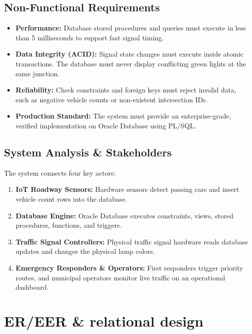 \documentclass[11pt,a4paper]{article}
\begin{document}
\subsection{Non-Functional Requirements}
\begin{itemize}
    \item \textbf{Performance:} Database stored procedures and queries must execute in less than 5 milliseconds to support fast signal timing.
    \item \textbf{Data Integrity (ACID):} Signal state changes must execute inside atomic transactions. The database must never display conflicting green lights at the same junction.
    \item \textbf{Reliability:} Check constraints and foreign keys must reject invalid data, such as negative vehicle counts or non-existent intersection IDs.
    \item \textbf{Production Standard:} The system must provide an enterprise-grade, verified implementation on Oracle Database using PL/SQL.
\end{itemize}

\subsection{System Analysis \& Stakeholders}
The system connects four key actors:
\begin{enumerate}
    \item \textbf{IoT Roadway Sensors:} Hardware sensors detect passing cars and insert vehicle count rows into the database.
    \item \textbf{Database Engine:} Oracle Database executes constraints, views, stored procedures, functions, and triggers.
    \item \textbf{Traffic Signal Controllers:} Physical traffic signal hardware reads database updates and changes the physical lamp colors.
    \item \textbf{Emergency Responders \& Operators:} First responders trigger priority routes, and municipal operators monitor live traffic on an operational dashboard.
\end{enumerate}


\section{ER/EER \& relational design}
\end{document}

